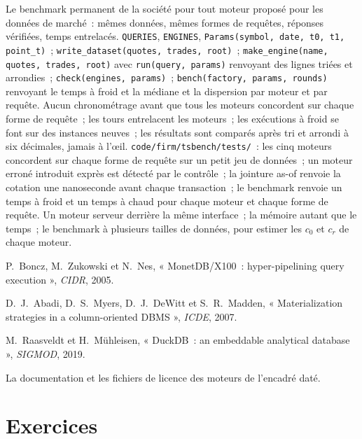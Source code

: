 \begin{build}
 Le benchmark permanent de la société pour tout moteur proposé pour les données de marché~: mêmes données, mêmes formes de requêtes, réponses vérifiées,
temps entrelacés.
 \texttt{QUERIES}, \texttt{ENGINES}, \texttt{Params(symbol, date, t0, t1, point\_t)}~;
\texttt{write\_dataset(quotes, trades, root)}~; \texttt{make\_engine(name, quotes, trades, root)} avec \texttt{run(query, params)}
renvoyant des lignes triées et arrondies~; \texttt{check(engines, params)}~; \texttt{bench(factory, params, rounds)} renvoyant le temps à froid et la médiane
et la dispersion par moteur et par requête.
 Aucun chronométrage avant que tous les moteurs concordent sur chaque forme de requête~; les tours entrelacent les moteurs~; les exécutions à froid se font sur des instances neuves~;
les résultats sont comparés après tri et arrondi à six décimales, jamais à l'œil.
 \texttt{code/firm/tsbench/tests/}~: les cinq moteurs concordent sur chaque forme de requête sur un petit jeu de données~; un moteur erroné
introduit exprès est détecté par le contrôle~; la jointure as-of renvoie la cotation une nanoseconde avant chaque transaction~; le benchmark renvoie
un temps à froid et un temps à chaud pour chaque moteur et chaque forme de requête.
 Un moteur serveur derrière la même interface~; la mémoire autant que le temps~; le benchmark à plusieurs tailles de données,
pour estimer les $c_0$ et $c_r$ de chaque moteur.
\end{build}

\begin{omsources}
\item P.~Boncz, M.~Zukowski et N.~Nes, « MonetDB/X100~: hyper-pipelining query execution », \emph{CIDR}, 2005.
\item D.~J.~Abadi, D.~S.~Myers, D.~J.~DeWitt et S.~R.~Madden, « Materialization strategies in a column-oriented DBMS »,
\emph{ICDE}, 2007.
\item M.~Raasveldt et H.~Mühleisen, « DuckDB~: an embeddable analytical database », \emph{SIGMOD}, 2019.
\item La documentation et les fichiers de licence des moteurs de l'encadré daté.
\end{omsources}

\section{Exercices}

